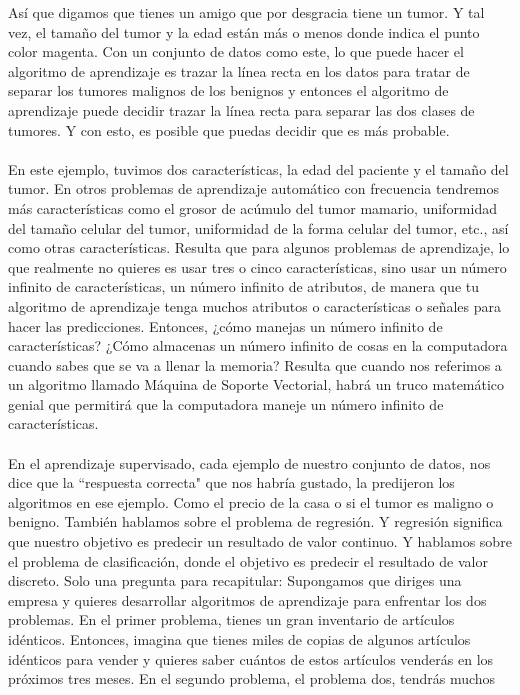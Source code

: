 \documentclass{report}
\begin{document}
Así que digamos que
tienes un amigo que por desgracia tiene un tumor. Y tal vez, el tamaño del tumor y la edad
están más o menos donde indica el punto color magenta. Con un conjunto de datos como este, lo que puede hacer el
algoritmo de aprendizaje es trazar la línea recta en los datos para tratar de separar los
tumores malignos de los benignos y entonces el algoritmo de aprendizaje puede decidir
trazar la línea recta para separar las dos clases de tumores.
Y con esto, es posible que puedas decidir que es más probable.\\\\En este ejemplo, tuvimos dos características,
la edad del paciente y el tamaño del tumor. En otros problemas de aprendizaje automático
con frecuencia tendremos más características como el grosor de acúmulo del
tumor mamario, uniformidad del tamaño celular del tumor, uniformidad de la forma celular del
tumor, etc., así como otras características. Resulta que para algunos problemas
de aprendizaje, lo que realmente no quieres es usar tres o cinco características, sino
usar un número infinito de características, un número infinito de
atributos, de manera que tu algoritmo de aprendizaje tenga muchos atributos o
características o señales para hacer las predicciones. Entonces, ¿cómo manejas un
número infinito de características? ¿Cómo almacenas un número infinito de
cosas en la computadora cuando sabes que se va a llenar la memoria? Resulta
que cuando nos referimos a un algoritmo llamado Máquina de
Soporte Vectorial, habrá un truco matemático genial que permitirá que la computadora maneje
un número infinito de características. \\\\ En el aprendizaje supervisado, cada ejemplo de
nuestro conjunto de datos, nos dice que la ``respuesta correcta" que nos habría gustado,
la predijeron los algoritmos en ese ejemplo. Como el precio de la
casa o si el tumor es maligno o benigno. También hablamos sobre el
problema de regresión. Y regresión significa que nuestro objetivo es predecir
un resultado de valor continuo. Y hablamos sobre el problema de clasificación, donde
el objetivo es predecir el resultado de valor discreto. Solo una pregunta para recapitular:
Supongamos que diriges una empresa y quieres desarrollar algoritmos de aprendizaje
para enfrentar los dos problemas. En el primer problema, tienes un gran inventario de
artículos idénticos. Entonces, imagina que tienes miles de copias de algunos artículos
idénticos para vender y quieres saber cuántos de estos artículos venderás en los
próximos tres meses. En el segundo problema, el problema dos, tendrás muchos
\end{document}
